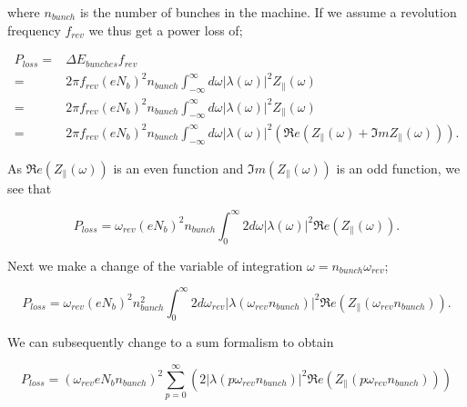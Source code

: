 where $n_{bunch}$ is the number of bunches in the machine. If we assume a revolution frequency $f_{rev}$ we thus get a power loss of;

\begin{align}
P_{loss}  = & \Delta E_{bunches} f_{rev}\nonumber \\  
 = & 2\pi f_{rev} \left( eN_{b}   \right)^{2}n_{bunch} \int^{\infty}_{-\infty} d\omega \left| \lambda \left( \omega \right)  \right|^{2} Z_{\parallel} \left( \omega \right) \nonumber  \\ 
 = & 2\pi f_{rev} \left( eN_{b}   \right)^{2}n_{bunch} \int^{\infty}_{-\infty} d\omega \left| \lambda \left( \omega \right)  \right|^{2} Z_{\parallel} \left( \omega \right) \nonumber \\
 = & 2\pi f_{rev} \left( eN_{b}   \right)^{2}n_{bunch} \int^{\infty}_{-\infty} d\omega \left| \lambda \left( \omega \right)  \right|^{2} \left( \Re{}e \left( Z_{\parallel} \left( \omega\right) + \Im{}m Z_{\parallel} \left( \omega\right) \right) \right).
\end{align}
 
As $\Re{}e\left(Z_{\parallel} \left( \omega\right)\right)$ is an even function and $\Im{}m\left(Z_{\parallel} \left( \omega\right)\right)$ is an odd function, we see that

\begin{equation}
P_{loss}   =  \omega_{rev} \left( eN_{b}   \right)^{2}n_{bunch} \int^{\infty}_{0} 2 d\omega \left| \lambda \left( \omega \right)  \right| ^{2}  \Re{}e \left( Z_{\parallel} \left( \omega\right)  \right).
\label{eqn:power_loss_omega}
\end{equation}

Next we make a change of the variable of integration $\omega = n_{bunch}\omega_{rev}$;

\begin{equation}
P_{loss}   =  \omega_{rev} \left( eN_{b}   \right)^{2}n_{bunch}^{2} \int^{\infty}_{0} 2 d\omega_{rev} \left| \lambda \left( \omega_{rev}n_{bunch} \right)  \right|^{2}  \Re{}e \left( Z_{\parallel} \left( \omega_{rev}n_{bunch}\right)  \right).
\end{equation}

We can subsequently change to a sum formalism to obtain

\begin{equation}
P_{loss} = \left( \omega_{rev}eN_{b}n_{bunch}  \right)^{2} \displaystyle\sum\limits_{p = 0}^{\infty} \left( 2 \left| \lambda \left(p \omega_{rev}n_{bunch} \right)  \right|^{2}  \Re{}e \left( Z_{\parallel} \left(p \omega_{rev}n_{bunch}\right) \right) \right) \label{ean:heating-gen}
\end{equation}

